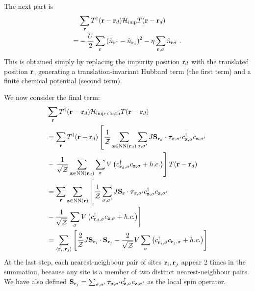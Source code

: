 \documentclass[reprint,hidelinks]{revtex4-2}
\begin{document}
The next part is
\begin{equation}\begin{aligned}
	&\sum_{{\bf r}}T^\dagger({\bf r} - {\bf r}_d)\mathcal{H}_\text{imp}T({\bf r} - {\bf r}_d) \\
	=& -\frac{U}{2}\sum_{{\bf r}}\left(\hat n_{{\bf r} \uparrow} - \hat n_{{\bf r} \downarrow} \right)^2 - \eta\sum_{{\bf r},\sigma} \hat n_{{\bf r}\sigma}~.
\end{aligned}\end{equation}
This is obtained simply by replacing the impurity position \({\bf r}_d\) with the translated position \({\bf r}\), generating a translation-invariant Hubbard term (the first term) and a finite chemical potential (second term).

We now consider the final term:
\begin{equation}\begin{aligned}
	&\sum_{{\bf r}}T^\dagger({\bf r} - {\bf r}_d)\mathcal{H}_\text{imp-cbath}T({\bf r} - {\bf r}_d)\\
	&=\sum_{{\bf r}}T^\dagger({\bf r} - {\bf r}_d)\left[\frac{1}{\mathcal{Z}}\sum_{{\bf z}\in\text{NN}({\bf r}_d)}\sum_{\sigma,\sigma^\prime}J {\bf S}_{{\bf r}_d}\cdot{\boldsymbol \tau}_{\sigma,\sigma^\prime}c^\dagger_{{\bf z},\sigma}c_{{\bf z},\sigma^\prime} \right.\\
				     &-  \left. \frac{1}{\sqrt\mathcal{Z}}\sum_{{\bf z}\in\text{NN}({\bf r}_d)}\sum_{\sigma} V \left(c^\dagger_{{\bf r}_d,\sigma} c_{{{\bf z}},\sigma} + h.c.\right)\right]T({\bf r} - {\bf r}_d)\\
	&=\sum_{{\bf r}}\sum_{{\bf z}\in\text{NN}({\bf r})}\left[\frac{1}{\mathcal{Z}}\sum_{\sigma,\sigma^\prime}J {\bf S}_{{\bf r}}\cdot{\boldsymbol \tau}_{\sigma,\sigma^\prime}c^\dagger_{{\bf z},\sigma}c_{{\bf z},\sigma^\prime} \right.\\
				     &-  \frac{1}{\sqrt\mathcal{Z}}\left.\sum_{\sigma} V\left(c^\dagger_{{\bf r}_d,\sigma} c_{{{\bf z}},\sigma} + h.c.\right)\right]\\
					 &=\sum_{\left< {\bf r}_i, {\bf r}_j\right>}\left[\frac{2}{\mathcal{Z}}J {\bf S}_{{\bf r}_i}\cdot{\bf S}_{{\bf r}_j} - \frac{2}{\sqrt\mathcal{Z}}V \sum_{\sigma}\left(c^\dagger_{{\bf r}_i,\sigma} c_{{{\bf r}_j},\sigma} + h.c.\right)\right]\\
\end{aligned}\end{equation}
At the last step, each nearest-neighbour pair of sites \({\bf r}_i, {\bf r}_j\) appear 2 times in the summation, because any site is a member of two distinct nearest-neighbour pairs. We have also defined \({\bf S}_{{\bf r}_j} =\sum_{\sigma,\sigma^\prime} {\boldsymbol \tau}_{\sigma,\sigma^\prime}c^\dagger_{{\bf z},\sigma}c_{{\bf z},\sigma^\prime}\) as the local spin operator.
\end{document}
